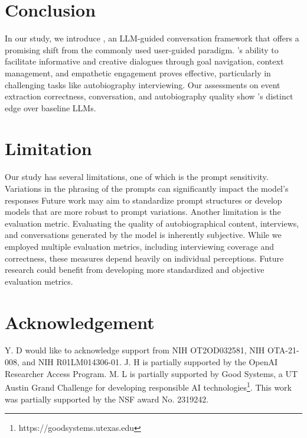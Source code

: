 

\section{Conclusion}
In our study, we introduce \methodname, an LLM-guided conversation framework that offers a promising shift from the commonly used user-guided paradigm. \methodname's ability to facilitate informative and creative dialogues through goal navigation, context management, and empathetic engagement proves effective, particularly in challenging tasks like autobiography interviewing. Our assessments on event extraction correctness, conversation, and autobiography quality show \methodname's distinct edge over baseline LLMs.

\section{Limitation}
Our study has several limitations, one of which is the prompt sensitivity. Variations in the phrasing of the prompts can significantly impact the model's responses Future work may aim to standardize prompt structures or develop models that are more robust to prompt variations. Another limitation is the evaluation metric. Evaluating the quality of autobiographical content, interviews, and conversations generated by the model is inherently subjective. While we employed multiple evaluation metrics, including interviewing coverage and correctness, these measures depend heavily on individual perceptions. Future research could benefit from developing more standardized and objective evaluation metrics.

\section*{Acknowledgement}
Y. D would like to acknowledge support from NIH OT2OD032581, NIH OTA-21-008, and NIH R01LM014306-01.
J. H is partially supported by the OpenAI Researcher Access Program. M. L is partially supported by Good Systems, a UT Austin Grand Challenge for developing responsible AI technologies\footnote{https://goodsystems.utexas.edu}. This work was partially supported by the NSF award No. 2319242.

